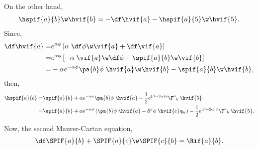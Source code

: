 On the other hand,
\begin{align}
  \hspif{a}{b}\w\hvif{b} = -\df\hvif{a} - \hspif{a}{5}\w\hvif{5}.
\end{align}
Since,
\begin{align}
  \df\hvif{a} 
  =& e^{\alpha\phi}\left[\alpha\;\df\phi\w\vif{a} +  \df\vif{a}\right]\nonumber\\
  =& e^{\alpha\phi}\left[-\alpha\;\vif{a}\w\df\phi -  \spif{a}{b}\w\vif{b}\right]\nonumber\\
  =& -\alpha e^{-\alpha\phi}\pa{b}\phi\;\hvif{a}\w\hvif{b} - \spif{a}{b}\w\hvif{b},
\end{align}
then,
\begin{align}
  \hspif{a}{b} =& \spif{a}{b} + \alpha e^{-\alpha\phi}\pa{b}\phi\;\hvif{a} - \frac{1}{2}e^{(\beta-2\alpha)\phi}\F^a{}_{ b}\;\hvif{5}\nonumber\\
  =& \spif{a}{b} + \alpha e^{-\alpha\phi}\left(\pa{b}\phi\;\hvif{a} - \partial^{a}\phi\;\hvif{c}\eta_{b c}\right) - \frac{1}{2}e^{(\beta-2\alpha)\phi}\F^a{}_{ b}\;\hvif{5}.
\end{align}

Now, the second Maurer-Cartan equation,
\begin{align}
  \df\SPIF{a}{b}+\SPIF{a}{c}\w\SPIF{c}{b}=\Rif{a}{b}.
\end{align}

